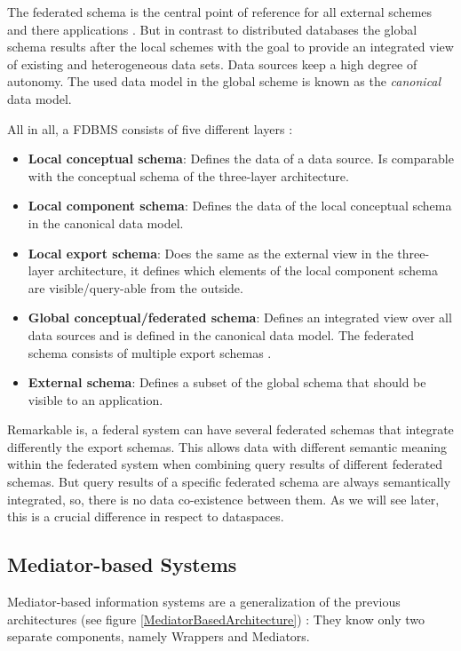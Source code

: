 The federated schema is the central point of reference for all external schemes and there applications \cite[p. 94]{DBLP:books/dp/LeserN2006}. But in contrast to distributed databases the global schema results after the local schemes with the goal to provide an integrated view of existing and heterogeneous data sets. Data sources keep a high degree of autonomy. The used data model in the global scheme is known as the \emph{canonical} data model. 

All in all, a FDBMS consists of five different layers \cite[p. 95]{DBLP:books/dp/LeserN2006}:

\begin{itemize}
\item \textbf{Local conceptual schema}: Defines the data of a data source. Is comparable with the conceptual schema of the three-layer architecture.
\item \textbf{Local component schema}: Defines the data of the local conceptual schema in the canonical data model. 
\item \textbf{Local export schema}: Does the same as the external view in the three-layer architecture, it defines which elements of the local component schema are visible/query-able from the outside.
\item \textbf{Global conceptual/federated schema}: Defines an integrated view over all data sources and is defined in the canonical data model. The federated schema consists of multiple export schemas \cite[p. 200]{Sheth:1990:FDS:96602.96604}.
\item \textbf{External schema}: Defines a subset of the global schema that should be visible to an application.
\end{itemize}

Remarkable is, a federal system can have several federated schemas that integrate differently the export schemas. This allows data with different semantic meaning within the federated system when combining query results of different federated schemas. But query results of a specific federated schema are always semantically integrated, so, there is no data co-existence between them. As we will see later, this is a crucial difference in respect to dataspaces.

\subsection{Mediator-based Systems}

Mediator-based information systems are a generalization of the previous architectures (see figure \ref{MediatorBasedArchitecture}) \cite[p. 97]{DBLP:books/dp/LeserN2006}: They know only two separate components, namely Wrappers and Mediators. 

